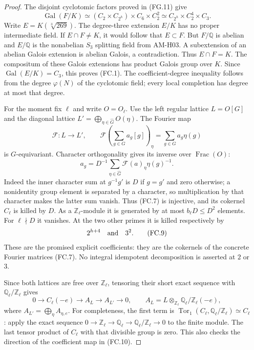 \begin{proof}
The disjoint cyclotomic factors proved in (FG.11) give
\[
 \operatorname{Gal}(F/K)
  \simeq(C_2\times C_{2^h})\times C_6\times C_2^2
  \simeq C_{2^h}\times C_2^4\times C_3.
\]
Write $E=K(\sqrt[3]{269})$.
The degree-three extension $E/K$ has no proper
intermediate field.  If $E\cap F\ne K$, it would follow
that $E\subset F$.  But $F/\mathbb Q$ is abelian and
$E/\mathbb Q$ is the nonabelian $S_3$ splitting field
from AM-H03.  A subextension of an abelian Galois
extension is abelian Galois, a contradiction.
Thus $E\cap F=K$.  The compositum of these Galois
extensions has product Galois group over $K$.
Since $\operatorname{Gal}(E/K)=C_3$, this proves (FC.1).
The coefficient-degree inequality follows from the
degree $\varphi(N)$ of the cyclotomic field; every
local completion has degree at most that degree.

For the moment fix $\ell$ and write $O=O_\ell$.
Use the left regular lattice $L=O[G]$ and the diagonal
lattice $L'=\bigoplus_{\eta\in\widehat G}O(\eta)$.
The Fourier map
\[
 \mathcal F:L\longrightarrow L',\qquad
 \mathcal F\left(\sum_{g\in G}a_g[g]\right)_\eta
                    =\sum_{g\in G}a_g\eta(g)          \tag{FC.7}
\]
is $G$-equivariant.  Character orthogonality gives its
inverse over $\operatorname{Frac}(O)$:
\[
       a_g=D^{-1}\sum_{\eta\in\widehat G}
                          \mathcal F(a)_\eta\eta(g)^{-1}.
                                                            \tag{FC.8}
\]
Indeed the inner character sum at $g^{-1}g'$ is $D$
if $g=g'$ and zero otherwise; a nonidentity group
element is separated by a character, so multiplication
by that character makes the latter sum vanish.
Thus (FC.7) is injective, and its cokernel
$C_\ell$ is killed by $D$.  As a $\mathbb Z_\ell$-module
it is generated by at most $b_\ell D\leq D^2$ elements.
For $\ell\nmid D$ it vanishes.  At the two other primes
it is killed respectively by
\[
                       2^{h+4}\quad\hbox{and}\quad3^2.
                                                            \tag{FC.9}
\]
These are the promised explicit coefficients: they are
the cokernels of the concrete Fourier matrices (FC.7).
No integral idempotent decomposition is asserted at
$2$ or $3$.

Since both lattices are free over $\mathbb Z_\ell$,
tensoring their short exact sequence with
$\mathbb Q_\ell/\mathbb Z_\ell$ gives
\[
 0\longrightarrow C_\ell(-e)
 \longrightarrow A_L
 \longrightarrow A_{L'}\longrightarrow0,
 \qquad
 A_L=L\otimes_{\mathbb Z_\ell}\mathbb Q_\ell/\mathbb Z_\ell(-e),
                                                            \tag{FC.10}
\]
where $A_{L'}=\bigoplus_\eta A_{\eta,e}$.
For completeness, the first term is
$\operatorname{Tor}_1(C_\ell,\mathbb Q_\ell/\mathbb Z_\ell)
\simeq C_\ell$: apply the exact sequence
$0\to\mathbb Z_\ell\to\mathbb Q_\ell
\to\mathbb Q_\ell/\mathbb Z_\ell\to0$ to the finite
module.  The last tensor product of $C_\ell$ with that
divisible group is zero.  This also checks the direction
of the coefficient map in (FC.10).


\end{proof}
